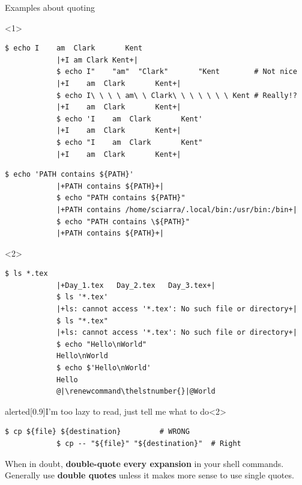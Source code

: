 \begin{frame}[fragile]{Examples about quoting}
    \begin{onlyenv}<1>
        \begin{lstlisting}[style=MyBash, style=oddnumbers]
            $ echo I    am  Clark       Kent
            |+I am Clark Kent+|
            $ echo I"    "am"  "Clark"       "Kent        # Not nice
            |+I    am  Clark       Kent+|
            $ echo I\ \ \ \ am\ \ Clark\ \ \ \ \ \ \ Kent # Really!?
            |+I    am  Clark       Kent+|
            $ echo 'I    am  Clark       Kent'
            |+I    am  Clark       Kent+|
            $ echo "I    am  Clark       Kent"
            |+I    am  Clark       Kent+|
        \end{lstlisting}
        \begin{lstlisting}[style=MyBash, style=oddnumbers, firstnumber=10, aboveskip=5mm]
            $ echo 'PATH contains ${PATH}'
            |+PATH contains ${PATH}+|
            $ echo "PATH contains ${PATH}"
            |+PATH contains /home/sciarra/.local/bin:/usr/bin:/bin+|
            $ echo "PATH contains \${PATH}"
            |+PATH contains ${PATH}+|
        \end{lstlisting}
    \end{onlyenv}
    \begin{onlyenv}<2>
        \renewcommand\thelstnumber{\ifnum\value{lstnumber}=11\relax\else\arabic{lstnumber}\fi}
        \begin{lstlisting}[style=MyBash, style=oddnumbers, firstnumber=16]
            $ ls *.tex
            |+Day_1.tex   Day_2.tex   Day_3.tex+|
            $ ls '*.tex'
            |+ls: cannot access '*.tex': No such file or directory+|
            $ ls "*.tex"
            |+ls: cannot access '*.tex': No such file or directory+|
            $ echo "Hello\nWorld"
            Hello\nWorld
            $ echo $'Hello\nWorld'
            Hello
            @|\renewcommand\thelstnumber{}|@World
        \end{lstlisting}
    \end{onlyenv}
    \begin{varblock}{alerted}[0.9\textwidth]{I'm too lazy to read, just tell me what to do}<2>
        \begin{lstlisting}[style=MyBash, numbers=none, belowskip=-6mm,aboveskip=2mm]
            $ cp ${file} ${destination}         # WRONG
            $ cp -- "${file}" "${destination}"  # Right
        \end{lstlisting}
        When in doubt, \textbf{double-quote every expansion} in your shell commands.\\
        Generally use \textbf{double quotes} unless it makes more sense to use single quotes.
    \end{varblock}
\end{frame}
